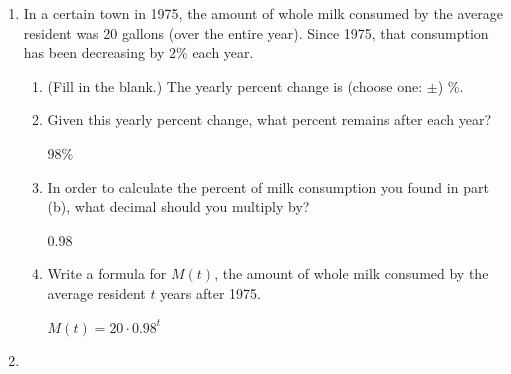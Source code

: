 \documentclass{article}
\begin{document}
\begin{enumerate}[resume]
\item \label{milk}


  \begin{problem}
    In a certain town in 1975, the amount of whole milk consumed by the average resident was 20 gallons (over the entire year). Since 1975, that consumption has been decreasing by $2\%$ each year. 
\end{problem}
    \begin{enumerate}
    \item (Fill in the blank.) The yearly percent change is (choose one: $\pm$)\fitb{.25in}{-} \%.

    \item Given this yearly percent change, what percent remains after each year?
    \begin{solution}
        98\%
    \end{solution}

\begin{problemonly}
    \vfill
\end{problemonly}

    \item In order to calculate the percent of milk consumption you found in part (b), what decimal should you multiply by?
\begin{problemonly}
    \vfill
\end{problemonly}
    \begin{solution}
        0.98
    \end{solution}
    
    \item Write a formula for $M(t)$, the amount of whole milk consumed by the average resident $t$ years after 1975.
  
\begin{problemonly}
    \vfill
\end{problemonly}
  \begin{solution} 
     $M(t) = 20 \cdot 0.98^t$
  \end{solution}
\end{enumerate}

\item  {}


\end{enumerate}
\end{document}
